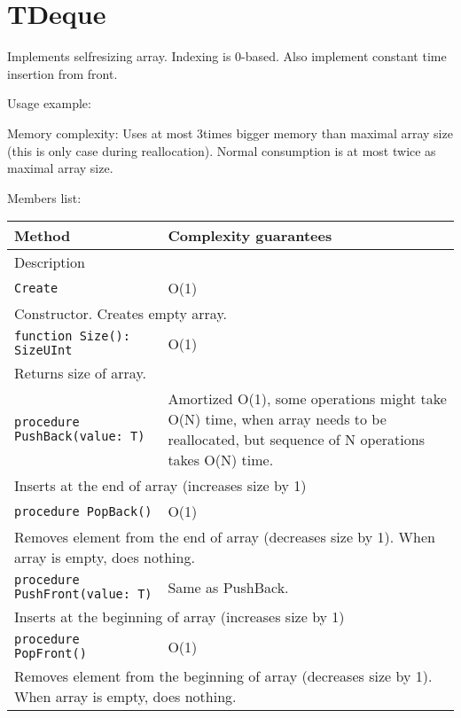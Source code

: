 \chapter{TDeque}

Implements selfresizing array. Indexing is 0-based.
Also implement constant time insertion from front.

Usage example:



Memory complexity:
Uses at most 3times bigger memory than maximal array size (this is only case during reallocation).
Normal consumption is at most twice as maximal array size.

Members list:

\begin{longtable}{|m{10cm}|m{5cm}|}
\hline
Method & Complexity guarantees \\ \hline
\multicolumn{2}{|m{15cm}|}{Description} \\ \hline\hline

\verb!Create! & O(1) \\ \hline
\multicolumn{2}{|m{15cm}|}{Constructor. Creates empty array.} \\ \hline\hline

\verb!function Size(): SizeUInt! & O(1) \\ \hline
\multicolumn{2}{|m{15cm}|}{Returns size of array.} \\\hline\hline

\verb!procedure PushBack(value: T)! &  Amortized
O(1), some operations might take O(N) time, when array needs to be reallocated, but sequence of N
operations takes O(N) time. \\ \hline
\multicolumn{2}{|m{15cm}|}{Inserts at the end of array (increases size by 1)} \\\hline\hline

\verb!procedure PopBack()! & O(1) \\\hline
\multicolumn{2}{|m{15cm}|}{Removes element from the end of array (decreases size by 1). When array
is empty, does nothing.} \\\hline\hline

\verb!procedure PushFront(value: T)! &  Same as PushBack. \\ \hline
\multicolumn{2}{|m{15cm}|}{Inserts at the beginning of array (increases size by 1)} \\\hline\hline

\verb!procedure PopFront()! & O(1) \\\hline
\multicolumn{2}{|m{15cm}|}{Removes element from the beginning of array (decreases size by 1). When array
is empty, does nothing.} \\\hline\hline


\end{longtable}
